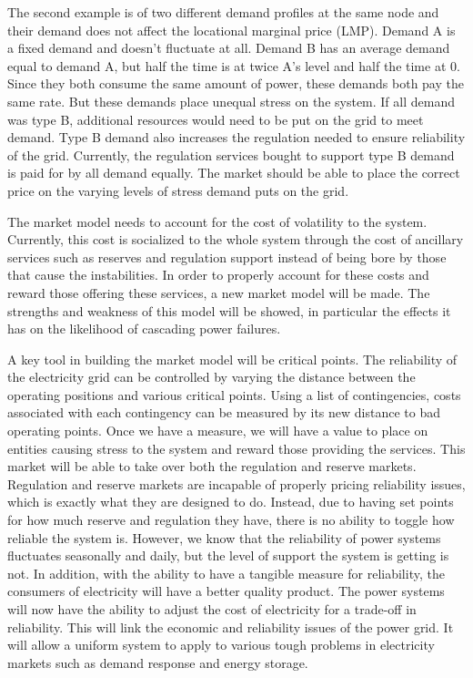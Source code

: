 \documentclass[class=report]{standalone}
\begin{document}
The second example is of two different demand profiles at the same node and their demand does not affect the locational marginal price (LMP).  Demand A is a fixed demand and doesn't fluctuate at all.  Demand B has an average demand equal to demand A, but half the time is at twice A's level and half the time at 0.  Since they both consume the same amount of power, these demands both pay the same rate.  But these demands place unequal stress on the system.  If all demand was type B, additional resources would need to be put on the grid to meet demand.  Type B demand also increases the regulation needed to ensure reliability of the grid.  Currently, the regulation services bought to support type B demand is paid for by all demand equally.  The market should be able to place the correct price on the varying levels of stress demand puts on the grid.     

The market model needs to account for the cost of volatility to the system.  Currently, this cost is socialized to the whole system through the cost of ancillary services such as reserves and regulation support instead of being bore by those that cause the instabilities.  In order to properly account for these costs and reward those offering these services, a new market model will be made.  The strengths and weakness of this model will be showed, in particular the effects it has on the likelihood of  cascading power failures.

A key tool in building the market model will be critical points. The reliability of the electricity grid can be controlled by varying the distance between the operating positions and various critical points.  Using a list of contingencies, costs associated with each contingency can be measured by its new distance to bad operating points.  Once we have a measure, we will have a value to place on entities causing stress to the system and reward those providing the services.  This market will be able to take over both the regulation and reserve markets.  Regulation and reserve markets are incapable of properly pricing reliability issues, which is exactly what they are designed to do.  Instead, due to having set points for how much reserve and regulation they have, there is no ability to toggle how reliable the system is.  However, we know that the reliability of power systems fluctuates seasonally and daily, but the level of support the system is getting is not.  In addition, with the ability to have a tangible measure for reliability, the consumers of electricity will have a better quality product.  The power systems will now have the ability to adjust the cost of electricity for a trade-off in reliability.  This will link the economic and reliability issues of the power grid.  It will allow a uniform system to apply to various tough problems in electricity markets such as demand response and energy storage.
\end{document}

